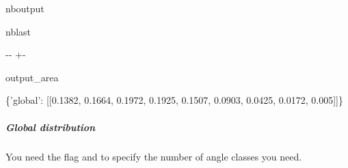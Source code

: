 \documentclass[letterpaper,10pt,english]{sphinxmanual}
\begin{document}
\begin{sphinxuseclass}{nboutput}
\begin{sphinxuseclass}{nblast}
{

\kern-\sphinxverbatimsmallskipamount\kern-\baselineskip
\kern+\FrameHeightAdjust\kern-\fboxrule
\vspace{\nbsphinxcodecellspacing}

\begin{sphinxuseclass}{output_area}
\begin{sphinxuseclass}{}


\begin{sphinxVerbatim}[commandchars=\\\{\}]
\{'global': [[0.1382, 0.1664, 0.1972, 0.1925, 0.1507, 0.0903, 0.0425, 0.0172, 0.005]]\}
\end{sphinxVerbatim}



\end{sphinxuseclass}
\end{sphinxuseclass}
}

\end{sphinxuseclass}
\end{sphinxuseclass}

\subparagraph{Global distribution}
\label{\detokenize{lightmodels_functionnalities:Global-distribution}}
\sphinxAtStartPar
You need the flag  and to specify the number of angle classes you need.
\end{document}
